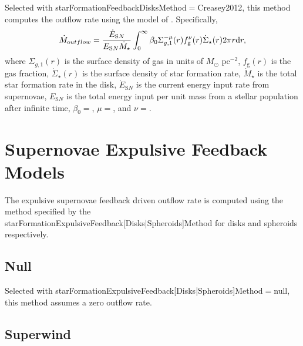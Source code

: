 Selected with {\normalfont \ttfamily starFormationFeedbackDisksMethod}$=${\normalfont \ttfamily Creasey2012}, this method computes the outflow rate using the model of \cite{creasey_how_2012}. Specifically,
\begin{equation}
\dot{M}_{\mathrm outflow} = {\dot{E}_{\mathrm SN} \over E_{\mathrm SN} \dot{M}_\star} \int_0^\infty \beta_0 \Sigma_{g,1}^{-\mu}(r) f_{\mathrm g}^\nu(r) \dot{\Sigma}_\star(r) 2 \pi r {\mathrm d}r,
\end{equation}
where $\Sigma_{g,1}(r)$ is the surface density of gas in units of $M_\odot$ pc$^{-2}$, $f_{\mathrm g}(r)$ is the gas fraction, $\dot{\Sigma}_\star(r)$ is the surface density of star formation rate, $\dot{M}_\star$ is the total star formation rate in the disk, $\dot{E}_{\mathrm SN}$ is the current energy input rate from supernovae, $E_{\mathrm SN}$ is the total energy input per unit mass from a stellar population after infinite time, $\beta_0=${\normalfont {}}, $\mu=${\normalfont \ttfamily [starFormationFeedbackDisksCreasy2012Mu]}, and $\nu=${\normalfont \ttfamily [starFormationFeedbackDisksCreasy2012Nu]}.

\section{Supernovae Expulsive Feedback Models}\label{sec:sneExpulsiveFeedback}

The expulsive supernovae feedback driven outflow rate is computed using the method specified by the {\normalfont \ttfamily starFormationExpulsiveFeedback[Disks|Spheroids]Method} for disks and spheroids respectively.

\subsection{Null}

Selected with {\normalfont \ttfamily starFormationExpulsiveFeedback[Disks|Spheroids]Method}$=${\normalfont \ttfamily null}, this method assumes a zero outflow rate.

\subsection{Superwind}

